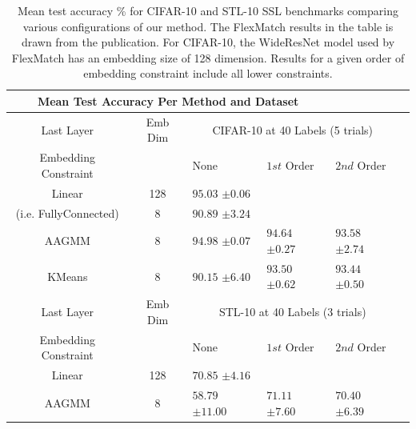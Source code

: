 \documentclass[10pt,twocolumn,letterpaper]{article}
\begin{document}
\begin{table}[ht!]
	\begin{tabularx}{\textwidth}{c|c|XXXX}
		\multicolumn{4}{c}{Mean Test Accuracy Per Method and Dataset} \\ \hline\hline
		Last Layer &   Emb Dim   & \multicolumn{3}{c}{CIFAR-10 at 40 Labels (5 trials)}            \\ 
		\hline
		Embedding Constraint  &  & None & $1st$ Order & $2nd$ Order\\ 
		\hline
		Linear & 128  & $95.03$ \scriptsize{$\pm 0.06$}   &  &  \\
		(i.e. FullyConnected) & 8  & $90.89$ \scriptsize{$\pm 3.24$}      &  & \\
		\hline
		AAGMM & 8  & $94.98$ \scriptsize{$\pm 0.07$}    & $94.64$ \scriptsize{$\pm 0.27$} & $93.58$ \scriptsize{$\pm 2.74$}  \\
		\hline
		KMeans & 8  & $90.15$ \scriptsize{$\pm 6.40$}    & $93.50$ \scriptsize{$\pm 0.62$} & $93.44$ \scriptsize{$\pm 0.50$}   \\
		
		\hline\hline
		Last Layer  &   Emb Dim  & \multicolumn{3}{c}{STL-10 at 40 Labels (3 trials)}            \\ 
		\hline
		\multicolumn{1}{c|}{Embedding Constraint} &  & None & $1st$ Order & $2nd$ Order  \\ 
		\hline
		Linear & 128  & $70.85$ \scriptsize{$\pm 4.16$}   &  &   \\
		\hline
		AAGMM & 8  & $58.79$ \scriptsize{$\pm 11.00$}    & $71.11$ \scriptsize{$\pm 7.60$} & $70.40$ \scriptsize{$\pm 6.39$}  \\
	\end{tabularx}
	\caption{Mean test accuracy \% for CIFAR-10 and STL-10 SSL benchmarks comparing various configurations of our method. The FlexMatch results in the table is drawn from the publication. For CIFAR-10, the WideResNet model used by FlexMatch has an embedding size of 128 dimension. Results for a given order of embedding constraint include all lower constraints.}
	\label{table1}
\end{table}

\end{document}
